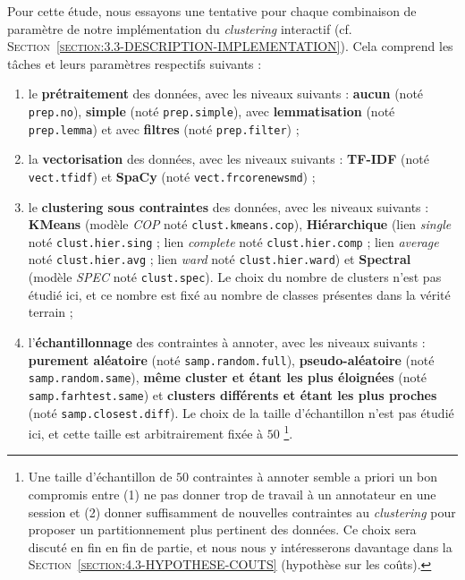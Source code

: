 			Pour cette étude, nous essayons une tentative pour chaque combinaison de paramètre de notre implémentation du \textit{clustering} interactif (cf. \textsc{Section~\ref{section:3.3-DESCRIPTION-IMPLEMENTATION}}). Cela comprend les tâches et leurs paramètres respectifs suivants :
			\begin{enumerate}
				\item le \textbf{prétraitement} des données, avec les niveaux suivants : \textbf{aucun} (noté \texttt{prep.no}), \textbf{simple} (noté \texttt{prep.simple}), avec \textbf{lemmatisation} (noté \texttt{prep.lemma}) et avec \textbf{filtres} (noté \texttt{prep.filter}) ;
				\item la \textbf{vectorisation} des données, avec les niveaux suivants : \textbf{TF-IDF} (noté \texttt{vect.tfidf}) et \textbf{SpaCy} (noté \texttt{vect.frcorenewsmd}) ;
				\item le \textbf{clustering sous contraintes} des données, avec les niveaux suivants : \textbf{KMeans} (modèle \textit{COP} noté \texttt{clust.kmeans.cop}), \textbf{Hiérarchique} (lien \textit{single} noté \texttt{clust.hier.sing} ; lien \textit{complete} noté \texttt{clust.hier.comp} ; lien \textit{average} noté \texttt{clust.hier.avg} ; lien \textit{ward} noté \texttt{clust.hier.ward}) et \textbf{Spectral} (modèle \textit{SPEC} noté \texttt{clust.spec}). Le choix du nombre de clusters n'est pas étudié ici, et ce nombre est fixé au nombre de classes présentes dans la vérité terrain ;
				\item l'\textbf{échantillonnage} des contraintes à annoter, avec les niveaux suivants : \textbf{purement aléatoire} (noté \texttt{samp.random.full}), \textbf{pseudo-aléatoire} (noté \texttt{samp.random.same}), \textbf{même cluster et étant les plus éloignées} (noté \texttt{samp.farhtest.same}) et \textbf{clusters différents et étant les plus proches} (noté \texttt{samp.closest.diff}). Le choix de la taille d'échantillon n'est pas étudié ici, et cette taille est arbitrairement fixée à $50$
				\footnote{Une taille d'échantillon de $50$ contraintes à annoter semble a priori un bon compromis entre (1) ne pas donner trop de travail à un annotateur en une session et (2) donner suffisamment de nouvelles contraintes au \textit{clustering} pour proposer un partitionnement plus pertinent des données. Ce choix sera discuté en fin en fin de partie, et nous nous y intéresserons davantage dans la \textsc{Section~\ref{section:4.3-HYPOTHESE-COUTS}} (hypothèse sur les coûts).}.
			\end{enumerate}
			

